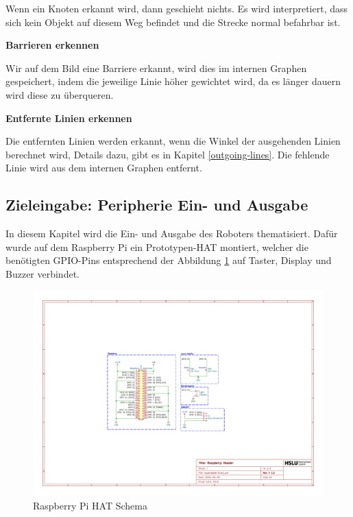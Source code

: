 Wenn ein Knoten erkannt wird, dann geschieht nichts. Es wird interpretiert, dass sich kein Objekt auf diesem Weg befindet und die Strecke normal befahrbar ist.

\textbf{Barrieren erkennen}

Wir auf dem Bild eine Barriere erkannt, wird dies im internen Graphen gespeichert, indem die jeweilige Linie höher gewichtet wird, da es länger dauern wird diese zu überqueren.

\textbf{Entfernte Linien erkennen}

Die entfernten Linien werden erkannt, wenn die Winkel der ausgehenden Linien berechnet wird, Details dazu, gibt es in Kapitel \ref{outgoing-lines}. Die fehlende Linie wird aus dem internen Graphen entfernt.

\newpage
\subsection{Zieleingabe: Peripherie Ein- und Ausgabe}

In diesem Kapitel wird die Ein- und Ausgabe des Roboters thematisiert.
Dafür wurde auf dem Raspberry Pi ein Prototypen-HAT montiert, welcher die benötigten GPIO-Pins entsprechend der Abbildung \ref{fig:raspiheader-schema} auf Taster, Display und Buzzer verbindet.

\begin{figure}[H]
    \centering
    \includegraphics[width=\linewidth, trim=7.5cm 6cm 10cm 6cm, clip]{assets/ET/PCB/raspiheader.pdf}
    \caption{Raspberry Pi HAT Schema}
    \label{fig:raspiheader-schema}
\end{figure}

